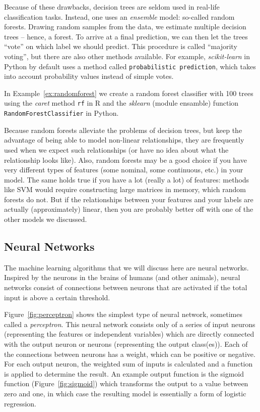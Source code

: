 Because of these drawbacks, decision trees are seldom used in
real-life classification tasks.  Instead, one uses an \emph{ensemble} model: so-called random forests.  Drawing random samples from the data, we estimate multiple
decision trees -- hence, a forest.  To arrive at a final prediction,
we can then  let the trees ``vote'' on which label we should
predict. This procedure is called ``majority voting'', but there are
also other methods available. For example, \emph{scikit-learn} in Python  by default uses a method called \texttt{probabilistic prediction}, which takes into
account probability values instead of simple votes.

In Example~\ref{ex:randomforest} we create a random forest classifier with 100 trees using the \emph{caret} method \texttt{rf} in R and the \emph{sklearn} (module ensamble) function \texttt{RandomForestClassifier} in Python.


Because random forests alleviate the problems of decision trees, but
keep the advantage of being able to model non-linear relationships,
they are frequently used when we expect such relationships (or have no
idea about what  the relationship looks like).  Also, random forests may
be a good choice if you have very different types of features (some
nominal, some continuous, etc.) in your model. The same holds true if
you have a lot (really a lot) of features: methods like SVM would require
constructing large matrices in memory, which random forests do not.
But if the relationships between your features and your labels are
actually (approximately) linear, then you are probably better off with
one of the other models we discussed.


\subsection{Neural Networks} \label{sec:neural}

The machine learning algorithms that we will discuss here are neural networks.
Inspired by the neurons in the brains of humans (and  other animals),
neural networks consist of connections between neurons that are activated if the
total input is above a certain threshold.

Figure~\ref{fig:perceptron} shows the simplest type of neural network, sometimes called a \emph{perceptron}.
This neural network consists only of a series of input neurons (representing the features or independent variables)
which are directly connected with the output neuron or neurons (representing the output class(es)).
Each of the connections between neurons has a weight, which can be positive or negative.
For each output neuron, the weighted sum of inputs is calculated and a function is applied to determine the result.
An example output function is the sigmoid function (Figure~\ref{fig:sigmoid}) which transforms the output to a value between zero and one,
in which case the resulting model is essentially a form of logistic regression.

